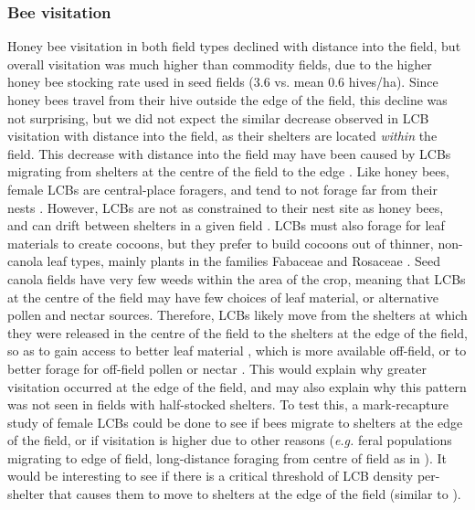 \documentclass[12pt]{article} %
\begin{document}
\subsubsection{Bee visitation} 
Honey bee visitation in both field types declined with distance into the field, but overall visitation was much higher than commodity fields, due to the higher honey bee stocking rate used in seed fields (3.6 vs. mean 0.6 hives/ha).
Since honey bees travel from their hive outside the edge of the field, this decline was not surprising, but we did not expect the similar decrease observed in LCB visitation with distance into the field, as their shelters are located \textit{within} the field.
This decrease with distance into the field may have been caused by LCBs migrating from shelters at the centre of the field to the edge \citep{goerzen1995}.
Like honey bees, female LCBs are central-place foragers, and tend to not forage far from their nests \citep{peterson2005,pitts2011, brunet2019}.
However, LCBs are not as constrained to their nest site as honey bees, and can drift between shelters in a given field \citep{goerzen1995, pittsSinger2013}.
LCBs must also forage for leaf materials to create cocoons, but they prefer to build cocoons out of thinner, non-canola leaf types, mainly plants in the families Fabaceae and Rosaceae \citep{sinu2018}.
Seed canola fields have very few weeds within the area of the crop, meaning that LCBs at the centre of the field may have few choices of leaf material, or alternative pollen and nectar sources.
Therefore, LCBs likely move from the shelters at which they were released in the centre of the field to the shelters at the edge of the field, so as to gain access to better leaf material \citep{horne1995}, which is more available off-field, or to better forage for off-field pollen or nectar \citep{horne1995b}.
This would explain why greater visitation occurred at the edge of the field, and may also explain why this pattern was not seen in fields with half-stocked shelters.
To test this, a mark-recapture study of female LCBs could be done to see if bees migrate to shelters at the edge of the field, or if visitation is higher due to other reasons (\textit{e.g.} feral populations migrating to edge of field, long-distance foraging from centre of field as in \citealp{peterson2005}).  %
It would be interesting to see if there is a critical threshold of LCB density per-shelter that causes them to move to shelters at the edge of the field (similar to \citealp{pittsSinger2013}).
\end{document}
